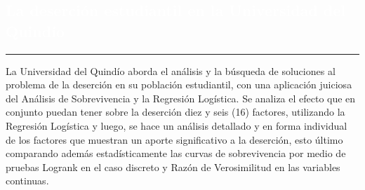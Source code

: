 \begin{titlepage}
\pagecolor{white}
\newcommand{\R}{\ensuremath{\mathbb{R}}}
\BgThispage
{}
\vspace*{-1.1cm}
\noindent
\def\titulo#1{\section{#1}}

\section{\bf\large\textcolor{white}{La deserci\'on estudiantil en la Universidad del Quind\'io}}
\vspace*{2cm}\par
\noindent

\begin{minipage}{0.5\linewidth}
\begin{minipage}{0.45\linewidth}
    \begin{flushright}
        \printauthor
    \end{flushright}
\end{minipage} \hspace{-3pt}
%
\begin{minipage}{0.02\linewidth}
   \color{ptctitle} \rule{1pt}{225pt}
\end{minipage} 
\end{minipage}
\hspace*{-4.5cm}
%
\begin{minipage}{0.85\linewidth}
\begin{minipage}{0.85\linewidth}
\footnotesize
\vspace{5pt}
    \begin{resumen}
    La Universidad del Quind\'io aborda el an\'alisis y la b\'usqueda de soluciones al
problema de la deserci\'on en su poblaci\'on estudiantil, con una aplicaci\'on
juiciosa del An\'alisis de Sobrevivencia y la Regresi\'on Log\'istica. Se analiza
el efecto que en conjunto puedan tener sobre la deserci\'on diez y seis (16)
factores, utilizando la Regresi\'on Log\'istica y luego, se hace un an\'alisis
detallado y en forma individual de los factores que muestran un aporte
significativo a la deserci\'on, esto \'ultimo comparando adem\'as estad\'isticamente
las curvas de sobrevivencia por medio de pruebas Logrank en el caso discreto
y Raz\'on de Verosimilitud en las variables continuas.


\end{resumen}
\end{minipage}
\end{minipage}
\end{titlepage}
